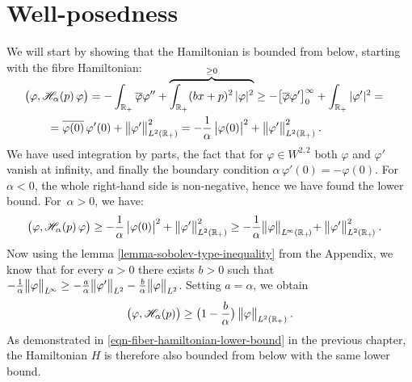 \section{Well-posedness}
We will start by showing that the Hamiltonian is bounded from below, starting with the fibre Hamiltonian:
\begin{align*}
    \\[-2\baselineskip]
    &\big( \varphi, \mathscr{H}_\alpha(p) \, \varphi \big)
    = - \int_{\mathbb{R}_+} \overline\varphi \varphi''
    + \overbrace{\int_{\mathbb{R}_+} (bx + p)^2 \, |\varphi|^2}^{\geq 0}
    \geq -\big[ \overline\varphi \varphi' \big]_0^{\infty}
    + \int_{\mathbb{R}_+} |\varphi'|^2
    = \\ &\qquad
    = \overline{ \varphi(0) } \, \varphi'(0)
    + \big\lVert  \varphi'  \big\rVert_{L^2(\mathbb{R}_+)}^2
    = - \frac{1}{\alpha} \, \big| \varphi(0) \big|^2
    + \big\lVert  \varphi'  \big\rVert_{L^2(\mathbb{R}_+)}^2
    \: .
\end{align*}
We have used integration by parts, the fact that for $\varphi \in W^{2,2}$ both $\varphi$ and $\varphi'$ vanish at infinity, and finally the boundary condition $\alpha \, \varphi'(0) = -\varphi(0)$. For~$\alpha < 0$, the whole right-hand side is non-negative, hence we have found the lower bound. For~$\alpha > 0$, we have:
\begin{align*}
    &\big( \varphi, \mathscr{H}_\alpha(p) \, \varphi \big)
    \geq - \frac{1}{\alpha} \, \big| \varphi(0) \big|^2
    + \big\lVert  \varphi'  \big\rVert_{L^2(\mathbb{R}_+)}^2
    \geq -\frac{1}{\alpha} \big\lVert \varphi \big\rVert_{L^{\!\infty}(\mathbb{R}_+\!)}
    \! + \big\lVert  \varphi'  \big\rVert_{L^2(\mathbb{R}_+\!)}^2
    \: .
\end{align*}
Now using the lemma \ref{lemma-sobolev-type-inequality} from the Appendix, we know that for every $a>0$ there exists $b>0$ such that $-\frac{1}{\alpha} \big\lVert \varphi \big\rVert_{L^{\!\infty}} \geq -\frac{a}{\alpha} \big\lVert \varphi' \big\rVert_{L^2} - \frac{b}{\alpha} \big\lVert \varphi \big\rVert_{L^2}$. Setting $a = \alpha$, we obtain
\begin{equation*}
    \big( \varphi, \mathscr{H}_\alpha(p) \big)
    \geq
    \big( 1 - \frac{b}{\alpha} \big) \,
    \big\lVert \varphi \big\rVert_{L^2(\mathbb{R}_+)}
    \: .
\end{equation*}
As demonstrated in \eqref{eqn-fiber-hamiltonian-lower-bound} in the previous chapter, the Hamiltonian $H$ is therefore also bounded from below with the same lower bound.

